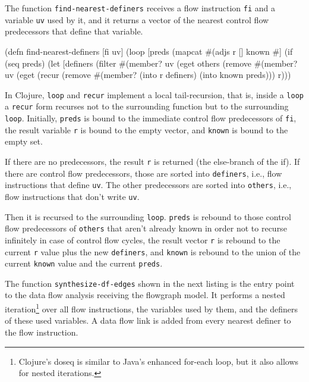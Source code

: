 \documentclass[11pt]{article}
\begin{document}
The function \verb|find-nearest-definers| receives a flow instruction \verb|fi|
and a variable \verb|uv| used by it, and it returns a vector of the nearest
control flow predecessors that define that variable.

\begin{clojurecode}
(defn find-nearest-definers [fi uv]
  (loop [preds (mapcat #(adjs %
         r []
         known #{}]
    (if (seq preds)
      (let [definers (filter #(member? uv (eget %
            others   (remove #(member? uv (eget %
        (recur (remove #(member? %
               (into r definers)
               (into known preds)))
      r)))
\end{clojurecode}

In Clojure, \verb|loop| and \verb|recur| implement a local tail-recursion, that
is, inside a \verb|loop| a \verb|recur| form recurses not to the surrounding
function but to the surrounding \verb|loop|.  Initially, \verb|preds| is bound
to the immediate control flow predecessors of \verb|fi|, the result variable
\verb|r| is bound to the empty vector, and \verb|known| is bound to the empty
set.

If there are no predecessors, the result \verb|r| is returned (the else-branch
of the if).  If there are control flow predecessors, those are sorted into
\verb|definers|, i.e., flow instructions that define \verb|uv|.  The other
predecessors are sorted into \verb|others|, i.e., flow instructions that don't
write \verb|uv|.

Then it is recursed to the surrounding \verb|loop|.  \verb|preds| is rebound to
those control flow predecessors of \verb|others| that aren't already known in
order not to recurse infinitely in case of control flow cycles, the result
vector \verb|r| is rebound to the current \verb|r| value plus the new
\verb|definers|, and \verb|known| is rebound to the union of the current
\verb|known| value and the current \verb|preds|.

The function \verb|synthesize-df-edges| shown in the next listing is the entry
point to the data flow analysis receiving the flowgraph model.  It performs a
nested iteration\footnote{Clojure's \textsf{doseq} is similar to Java's
  enhanced for-each loop, but it also allows for nested iterations.} over all
flow instructions, the variables used by them, and the definers of these used
variables.  A data flow link is added from every nearest definer to the flow
instruction.
\end{document}
